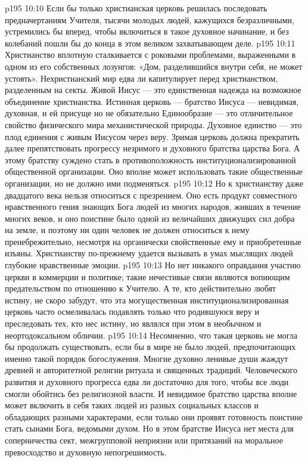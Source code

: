\vs p195 10:10 Если бы только христианская церковь решилась последовать предначертаниям Учителя, тысячи молодых людей, кажущихся безразличными, устремились бы вперед, чтобы включиться в такое духовное начинание, и без колебаний пошли бы до конца в этом великом захватывающем деле.
\vs p195 10:11 Христианство вплотную сталкивается с роковыми проблемами, выраженными в одном из его собственных лозунгов: «Дом, разделившийся внутри себя, не может устоять». Нехристианский мир едва ли капитулирует перед христианством, разделенным на секты. Живой Иисус --- это единственная надежда на возможное объединение христианства. Истинная церковь --- братство Иисуса --- невидимая, духовная, и ей присуще  но не обязательно  Единообразие --- это отличительное свойство физического мира механистической природы. Духовное единство --- это плод единения с живым Иисусом через веру. Зримая церковь должна прекратить далее препятствовать прогрессу незримого и духовного братства царства Бога. А этому братству суждено стать  в противоположность институционализированной общественной организации. Оно вполне может использовать такие общественные организации, но не должно ими подменяться.
\vs p195 10:12 Но к христианству даже двадцатого века нельзя относиться с презрением. Оно есть продукт совместного нравственного гения знающих Бога людей из многих народов, живших в течение многих веков, и оно поистине было одной из величайших движущих сил добра на земле, и поэтому ни один человек не должен относиться к нему пренебрежительно, несмотря на органически свойственные ему и приобретенные изъяны. Христианству по\hyp{}прежнему удается вызывать в умах мыслящих людей глубокие нравственные эмоции.
\vs p195 10:13 Но нет никакого оправдания участию церкви в коммерции и политике; такие нечестивые связи являются вопиющим предательством по отношению к Учителю. А те, кто действительно любят истину, не скоро забудут, что эта могущественная институционализированная церковь часто осмеливалась подавлять только что родившуюся веру и преследовать тех, кто нес истину, но являлся при этом в необычном и неортодоксальном обличии.
\vs p195 10:14 Несомненно, что такая церковь не могла бы продолжать существовать, если бы в мире не было людей, предпочитающих именно такой порядок богослужения. Многие духовно ленивые души жаждут древней и авторитетной религии ритуала и священных традиций. Человеческого развития и духовного прогресса едва ли достаточно для того, чтобы все люди смогли обойтись без религиозной власти. И невидимое братство царства вполне может включить в себя таких людей из разных социальных классов и обладающих разными характерами, если только они проявят готовность поистине стать сынами Бога, ведомыми духом. Но в этом братстве Иисуса нет места для соперничества сект, межгрупповой неприязни или притязаний на моральное превосходство и духовную непогрешимость.

